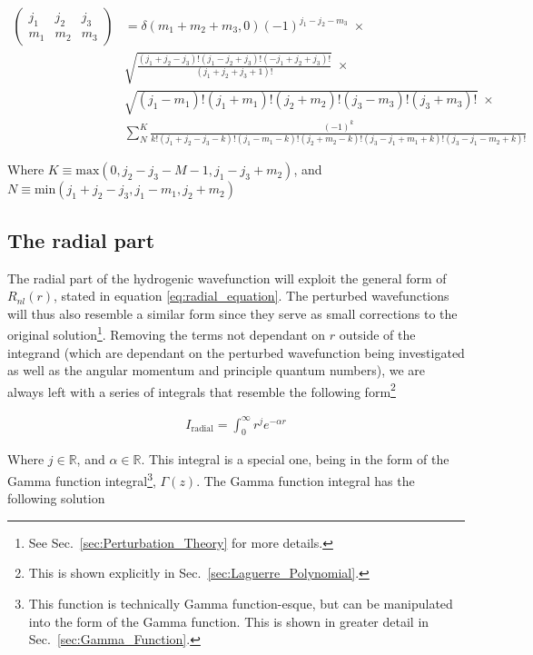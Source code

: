         \begin{align}
            \begin{pmatrix}
                j_1 & j_2 & j_3\\
                m_1 & m_2 & m_3
            \end{pmatrix} &= \delta(m_1 + m_2 + m_3, 0) (-1)^{j_1 - j_2 - m_3} \;\times \\
            & \sqrt{\frac{(j_1 + j_2 - j_3)! (j_1 - j_2 + j_3)!(-j_1 + j_2 + j_3)!}{(j_1 + j_2 + j_3 + 1)!}} \;\times \nonumber \\
            &\sqrt{(j_1 - m_1)!(j_1 + m_1)!(j_2 + m_2)!(j_3 - m_3)! (j_3 + m_3)!} \;\times \nonumber\\
             &\sum_{N}^{K} \frac{(-1)^k}{k!(j_1 + j_2 - j_3 - k)!(j_1 - m_1 - k)!(j_2  + m_2 - k)!(j_3 - j_1 + m_1 + k)!(j_3 - j_1 - m_2 + k)!}\nonumber
        \end{align}

        Where $K \equiv \text{max}(0, j_2 - j_3 - M-1, j_1 - j_3 + m_2)$, and $N \equiv \text{min}(j_1 + j_2 - j_3, j_1 - m_1, j_2 + m_2)$

        \subsection{The radial part} \label{sec:The_Radial_Part}
            The radial part of the hydrogenic wavefunction will exploit the general form of $R_{nl}(r)$, stated in equation \ref{eq:radial_equation}. The perturbed wavefunctions will thus also resemble a similar form since they serve as small corrections to the original solution\footnote{See Sec.~\ref{sec:Perturbation_Theory} for more details.}. Removing the terms not dependant on $r$ outside of the integrand (which are dependant on the perturbed wavefunction being investigated as well as the angular momentum and principle quantum numbers), we are always left with a series of integrals that resemble the following form\footnote{This is shown explicitly in Sec.~\ref{sec:Laguerre_Polynomial}.}

            \begin{align}
                I_{\text{radial}} = \int_0^\infty r^j e^{-\alpha r}
            \end{align}

            Where $j \in \mathbb{R}$, and $\alpha \in \mathbb{R}$. This integral is a special one, being in the form of the Gamma function integral\footnote{This function is technically Gamma function-esque, but can be manipulated into the form of the Gamma function. This is shown in greater detail in Sec.~\ref{sec:Gamma_Function}.}, $\Gamma(z)$. The Gamma function integral has the following solution 

